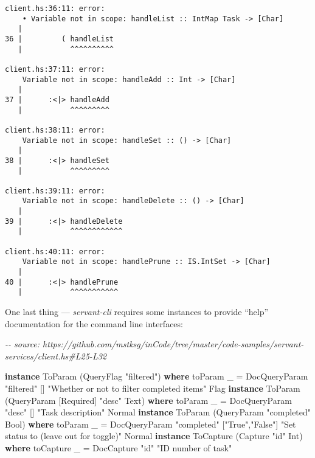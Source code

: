 \documentclass[]{article}
\newenvironment{Shaded}{}{}
\newcommand{\CommentTok}[1]{\textcolor[rgb]{0.38,0.63,0.69}{\textit{#1}}}
\newcommand{\DataTypeTok}[1]{\textcolor[rgb]{0.56,0.13,0.00}{#1}}
\newcommand{\KeywordTok}[1]{\textcolor[rgb]{0.00,0.44,0.13}{\textbf{#1}}}
\newcommand{\NormalTok}[1]{#1}
\newcommand{\OtherTok}[1]{\textcolor[rgb]{0.00,0.44,0.13}{#1}}
\newcommand{\StringTok}[1]{\textcolor[rgb]{0.25,0.44,0.63}{#1}}
\begin{document}
\begin{verbatim}
client.hs:36:11: error:
    • Variable not in scope: handleList :: IntMap Task -> [Char]
   |
36 |         ( handleList
   |           ^^^^^^^^^^

client.hs:37:11: error:
    Variable not in scope: handleAdd :: Int -> [Char]
   |
37 |      :<|> handleAdd
   |           ^^^^^^^^^

client.hs:38:11: error:
    Variable not in scope: handleSet :: () -> [Char]
   |
38 |      :<|> handleSet
   |           ^^^^^^^^^

client.hs:39:11: error:
    Variable not in scope: handleDelete :: () -> [Char]
   |
39 |      :<|> handleDelete
   |           ^^^^^^^^^^^^

client.hs:40:11: error:
    Variable not in scope: handlePrune :: IS.IntSet -> [Char]
   |
40 |      :<|> handlePrune
   |           ^^^^^^^^^^^
\end{verbatim}

One last thing --- \emph{servant-cli} requires some instances to provide
``help'' documentation for the command line interfaces:

\begin{Shaded}
\begin{Highlighting}[]
\CommentTok{{-}{-} source: https://github.com/mstksg/inCode/tree/master/code{-}samples/servant{-}services/client.hs\#L25{-}L32}

\KeywordTok{instance} \DataTypeTok{ToParam}\NormalTok{ (}\DataTypeTok{QueryFlag} \StringTok{"filtered"}\NormalTok{) }\KeywordTok{where}
\NormalTok{    toParam \_ }\OtherTok{=} \DataTypeTok{DocQueryParam} \StringTok{"filtered"}\NormalTok{ [] }\StringTok{"Whether or not to filter completed items"} \DataTypeTok{Flag}
\KeywordTok{instance} \DataTypeTok{ToParam}\NormalTok{ (}\DataTypeTok{QueryParam\textquotesingle{}}\NormalTok{ \textquotesingle{}[}\DataTypeTok{Required}\NormalTok{] }\StringTok{"desc"} \DataTypeTok{Text}\NormalTok{) }\KeywordTok{where}
\NormalTok{    toParam \_ }\OtherTok{=} \DataTypeTok{DocQueryParam} \StringTok{"desc"}\NormalTok{ [] }\StringTok{"Task description"} \DataTypeTok{Normal}
\KeywordTok{instance} \DataTypeTok{ToParam}\NormalTok{ (}\DataTypeTok{QueryParam} \StringTok{"completed"} \DataTypeTok{Bool}\NormalTok{) }\KeywordTok{where}
\NormalTok{    toParam \_ }\OtherTok{=} \DataTypeTok{DocQueryParam} \StringTok{"completed"}\NormalTok{ [}\StringTok{"True"}\NormalTok{,}\StringTok{"False"}\NormalTok{] }\StringTok{"Set status to (leave out for toggle)"} \DataTypeTok{Normal}
\KeywordTok{instance} \DataTypeTok{ToCapture}\NormalTok{ (}\DataTypeTok{Capture} \StringTok{"id"} \DataTypeTok{Int}\NormalTok{) }\KeywordTok{where}
\NormalTok{    toCapture \_ }\OtherTok{=} \DataTypeTok{DocCapture} \StringTok{"id"} \StringTok{"ID number of task"}
\end{Highlighting}
\end{Shaded}
\end{document}
